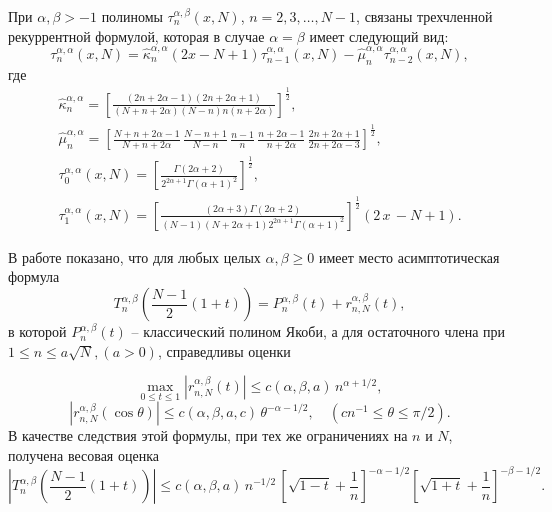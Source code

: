 При $\alpha, \beta > -1$ полиномы $\tau_n^{\alpha,\beta}(x,N)$, $n=2,3,\ldots,N-1$, связаны трехчленной рекуррентной формулой, которая в случае $\alpha=\beta$ имеет следующий вид:
\begin{equation}
\label{sob-tcheb-difference-3.19}
\tau_n^{\alpha,\alpha}(x,N)=
\hat\kappa^{\alpha,\alpha}_n(2x-N+1)\tau_{n-1}^{\alpha,\alpha}(x,N)-\hat\mu^{\alpha,\alpha}_n\tau_{n-2}^{\alpha,\alpha}(x,N),
\end{equation}
где
\begin{gather*}
\hat\kappa^{\alpha,\alpha}_n= \left[\frac{(2n+2\alpha-1)(2n+2\alpha+1)}{(N+n+2\alpha)(N-n)n(n+2\alpha)}\right]^\frac12,\\
\hat\mu^{\alpha,\alpha}_n=
\left[\frac{N+n+2\alpha-1}{N+n+2\alpha}\,\frac{N-n+1}{N-n}\,\frac{n-1}n\,
\frac{n+2\alpha-1}{n+2\alpha}\,\frac{2n+2\alpha+1}{2n+2\alpha-3}\right]^\frac12,\\
\tau_0^{\alpha,\alpha}(x,N)=\left[\frac{\Gamma(2\alpha+2)}{2^{2\alpha+1}\Gamma(\alpha+1)^2}\right]^\frac12,\\
\tau_1^{\alpha,\alpha}(x,N)=\left[\frac{(2\alpha+3)\Gamma(2\alpha+2)}{(N-1)(N+2\alpha+1)2^{2\alpha+1}\Gamma(\alpha+1)^2
}\right]^\frac12
(2\,x\,-N+1).
\end{gather*}


В работе \cite{sob-tcheb-difference-Shar16} %
 показано, что для любых целых $\alpha,\beta \geq 0$ имеет место асимптотическая формула
\begin{equation}\label{asymptf}
 T_{n}^{\alpha,\beta}\left( \frac{N-1}{2}(1+t) \right) = P_{n}^{\alpha,\beta}(t)+r_{n,N}^{\alpha,\beta}(t),
\end{equation}
в которой $P_{n}^{\alpha,\beta}(t)$ -- классический полином Якоби, а для остаточного члена при $1 \leq n \leq a\sqrt{N}, (a>0)$, справедливы оценки

\begin{equation}\label{asymptRest1}
  \max\limits_{0\leq t \leq 1} |r_{n,N}^{\alpha,\beta}(t)| \leq c(\alpha,\beta,a)\,n^{\alpha+1/2},
\end{equation}
\begin{equation}\label{asymptRest1}
  |r_{n,N}^{\alpha,\beta}(\cos{\theta})| \leq c(\alpha,\beta,a,c)\,\theta^{-\alpha-1/2}, \quad \left( cn^{-1} \leq \theta \leq \pi/2\right).
\end{equation}
В качестве следствия этой формулы, при тех же ограничениях на $n$ и $N$, получена весовая оценка
\begin{equation}\label{weightEst}
  \left| T_{n}^{\alpha,\beta}\left(\frac{N-1}{2}(1+t)\right)\right| \leq
    c(\alpha,\beta,a)\,n^{-1/2}\,
    \left[  \sqrt{1-t} + \frac1n \right]^{-\alpha-1/2}
    \left[  \sqrt{1+t} + \frac1n \right]^{-\beta-1/2}.
\end{equation}











